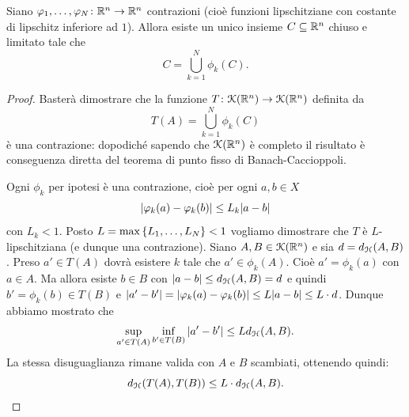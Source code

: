 \begin{theorem}
Siano $\varphi_1, \dots, \varphi_N \colon {\mathbb R}^n \to {\mathbb R}^n$ contrazioni (cioè funzioni lipschitziane con costante di lipschitz inferiore ad $1$).
Allora
esiste un unico insieme $C\subseteq {\mathbb R}^n$ chiuso e limitato tale che
\[
  C = \bigcup_{k=1}^N \phi_k(C).
\]
\end{theorem}
%
\begin{proof}
Basterà dimostrare che la funzione $T\colon \mathcal K({\mathbb R}^n)\to \mathcal K({\mathbb R}^n)$ definita da
\[
  T(A) = \bigcup_{k=1}^N \phi_k(C)
\]
è una contrazione: dopodiché sapendo che $\mathcal K({\mathbb R}^n)$ è completo il risultato è conseguenza diretta del teorema di punto fisso di Banach-Caccioppoli.

Ogni $\phi_k$ per ipotesi è una contrazione, cioè
per ogni $a,b\in X$
\[
  {\left|\varphi_k(a)-\varphi_k(b)\right|} \le L_k {\left|a-b\right|}
\]
con $L_k< 1$. Posto $L=\max {\left\{ L_1, \dots, L_N \right\}} < 1$ vogliamo dimostrare che $T$ è $L$-lipschitziana (e dunque una contrazione). Siano $A,B \in \mathcal K({\mathbb R}^n)$ e sia $d = d_\mathcal H(A,B)$. Preso $a' \in T(A)$ dovrà esistere $k$ tale che $a' \in \phi_k(A)$. Cioè $a'= \phi_k(a)$ con $a\in A$. Ma allora esiste $b\in B$ con ${\left|a-b\right|}\le d_\mathcal H(A,B) = d$ e quindi $b'=\phi_k(b) \in T(B)$ e ${\left|a'-b'\right|} = {\left|\varphi_k(a)-\varphi_k(b)\right|} \le L {\left|a-b\right|} \le L \cdot d$. Dunque abbiamo mostrato che
\[
  \sup_{a' \in T(A)} \inf_{b'\in T(B)} {\left|a'-b'\right|} \le L d_\mathcal H(A,B).
\]
La stessa disuguaglianza rimane valida con $A$ e $B$ scambiati, ottenendo quindi:
\[
  d_\mathcal H(T(A),T(B)) \le L\cdot d_\mathcal H(A,B).
\]
\end{proof}


